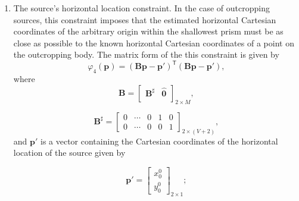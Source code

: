 \begin{enumerate}
\item The source's horizontal location constraint. In the case of outcropping sources, this constraint imposes that the estimated horizontal Cartesian coordinates of the arbitrary origin within the shallowest prism must be as close as possible to the known horizontal Cartesian coordinates of a point on the outcropping body. The matrix form of the this constraint is given by
\begin{equation}
\varphi_{4}(\mathbf{p}) = \left(\mathbf{B}\mathbf{p} - \mathbf{p}'\right)^\mathsf{T}\left(\mathbf{B}\mathbf{p} - \mathbf{p}'\right) ,
\end{equation}
where
\begin{equation}
\mathbf{B} = 
\begin{bmatrix}
\mathbf{B}^{\sharp} & \hat{\mathbf{0}} \\
\end{bmatrix}_{2\times M} ,
\end{equation}

\begin{equation}
\textbf{B}^{\sharp} = 
\begin{bmatrix}
0 & \cdots & 0 & 1 & 0 \\
0 & \cdots & 0 & 0 & 1
\end{bmatrix}_{2\times (V+2)},
\end{equation}
and $\textbf{p}'$ is a vector containing the Cartesian coordinates of the horizontal location of the source given by

\begin{equation}
\textbf{p}' = 
\begin{bmatrix}
x^0_0 \\
y^0_0
\end{bmatrix}_{2\times 1} ;
\end{equation}


\end{enumerate}
